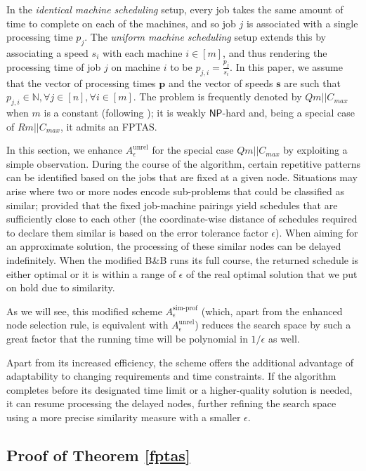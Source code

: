 \documentclass[a4paper,UKenglish,cleveref, autoref, thm-restate, pdfa]{lipics-v2021}
\theoremstyle{plain}
\begin{document}
In the \emph{identical machine scheduling} setup, every job takes the same amount of time to complete on each of the machines, and so job $j$ is associated with a single processing time $p_j$. The \emph{uniform machine scheduling} setup extends this by associating a speed $s_i$ with each machine $i \in [m]$, and thus rendering the processing time of job $j$ on machine $i$ to be $p_{j, i} = \frac{p_j}{s_i}$. In this paper, we assume that the vector of processing times $\bm{p}$ and the vector of speeds $\bm{s}$ are such that $p_{j,i} \in \mathbb{N}, \forall j \in [n], \forall i \in [m]$. The problem is frequently denoted by $Qm||C_{max}$ when $m$ is a constant (following \cite{machine_scheduling_review}); it is weakly $\mathsf{NP}$-hard and, being a special case of $Rm||C_{max}$, it admits an FPTAS.

In this section, we enhance $A^{\text{unrel}}_{\epsilon}$ for the special case $Qm||C_{max}$ by exploiting a simple observation. During the course of the algorithm, certain repetitive patterns can be identified based on the jobs that are fixed at a given node. Situations may arise where two or more nodes encode sub-problems that could be classified as similar; provided that the fixed job-machine pairings yield schedules that are sufficiently close to each other (the coordinate-wise distance of schedules required to declare them similar is based on the error tolerance factor $\epsilon$). When aiming for an approximate solution, the processing of these similar nodes can be delayed indefinitely. When the modified B\&B runs its full course, the returned schedule is either optimal or it is within a range of $\epsilon$ of the real optimal solution that we put on hold due to similarity.

As we will see, this modified scheme $A^{\text{sim-prof}}_{\epsilon}$ (which, apart from the enhanced node selection rule, is equivalent with $A^{\text{unrel}}_{\epsilon}$) reduces the search space by such a great factor that the running time will be polynomial in $1/\epsilon$ as well.

\fptas

Apart from its increased efficiency, the scheme offers the additional advantage of adaptability to changing requirements and time constraints. If the algorithm completes before its designated time limit or a higher-quality solution is needed, it can resume processing the delayed nodes, further refining the search space using a more precise similarity measure with a smaller $\epsilon$.

 
\subsection{Proof of Theorem \ref{fptas}}\label{sec:js_fptas_proof}
\end{document}
